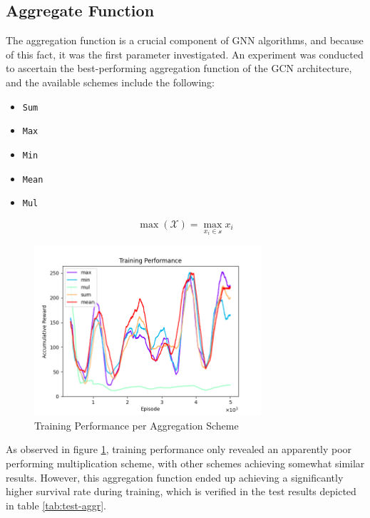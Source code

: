 \subsection{Aggregate Function} \label{sec:results-aggr}

The aggregation function is a crucial component of \ac{GNN} algorithms, and because of this fact, it was the first parameter investigated. An experiment was conducted to ascertain the best-performing aggregation function of the \ac{GCN} architecture, and the available schemes include the following:
\begin{itemize}
	\item \texttt{Sum}
	\item \texttt{Max}
	\item \texttt{Min}
	\item \texttt{Mean}
	\item \texttt{Mul}
\end{itemize}
\begin{equation}
	\max (\mathcal{X}) = \max_{x_i \in \mathcal{x}} x_i
\end{equation}


\begin{figure}[ht]
	\includegraphics[width=0.75\textwidth]{graphs/aggr/training_performance.png}
	\caption{Training Performance per Aggregation Scheme}
	\label{fig:train-perf-aggr}
\end{figure}

As observed in figure \ref{fig:train-perf-aggr}, training performance  only revealed an apparently poor performing multiplication scheme, with other schemes achieving somewhat similar results. However, this aggregation function ended up achieving a significantly higher survival rate during training, which is verified in the test results depicted in table \ref{tab:test-aggr}. \par

